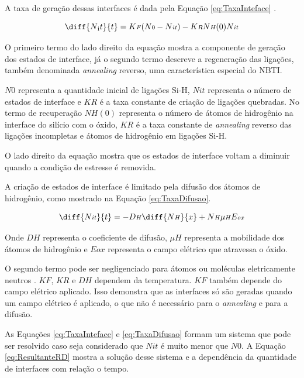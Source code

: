 A taxa de geração dessas interfaces é dada pela Equação \ref{eq:TaxaInteface} \cite{Lorenz}.

\begin{equation}
    \label{eq:TaxaInteface}
    \diff{N{\textsubscript it}}{t} = K{\scriptstyle F}(N{\scriptstyle 0} - N{\scriptstyle it}) - K{\scriptstyle R}N{\scriptstyle H}(0)N{\scriptstyle it}
\end{equation}

O primeiro termo do lado direito da equação mostra a componente de geração dos estados de interface, já o segundo termo descreve a regeneração das ligações, também denominada \textit{annealing} reverso, uma característica especial do NBTI.

$N\scriptstyle{0}$ representa a quantidade inicial de ligações Si-H, $N\scriptstyle{it}$ representa o número de estados de interface e $K\scriptstyle{R}$ é a taxa constante de criação de ligações quebradas. No termo de recuperação $N\scriptstyle{H}(0)$ representa o número de átomos de hidrogênio na interface do silício com o óxido, $K\scriptstyle{R}$ é a taxa constante de \textit{annealing} reverso das ligações incompletas e átomos de hidrogênio em ligações Si-H.

O lado direito da equação mostra que os estados de interface voltam a diminuir quando a condição de estresse é removida.

A criação de estados de interface é limitado pela difusão dos átomos de hidrogênio, como mostrado na Equação \ref{eq:TaxaDifusao}.

\begin{equation}
    \label{eq:TaxaDifusao}
    \diff{N{\scriptstyle it}}{t} = - D{\scriptstyle H}\diff{N{\scriptstyle H}}{x} + N{\scriptstyle H}\mu{\scriptstyle H}E{\scriptstyle ox}
\end{equation}

Onde $D\scriptstyle{H}$ representa o coeficiente de difusão, $\mu\scriptstyle{H}$ representa a mobilidade dos átomos de hidrogênio e $E\scriptstyle{ox}$ representa o campo elétrico que atravessa o óxido.

O segundo termo pode ser negligenciado para átomos ou moléculas eletricamente neutros \cite{Lorenz}. $K\scriptstyle{F}$, $K\scriptstyle{R}$ e $D\scriptstyle{H}$ dependem da temperatura. $K\scriptstyle{F}$ também depende do campo elétrico aplicado. Isso demonstra que as interfaces só são geradas quando um campo elétrico é aplicado, o que não é necessário para o \textit{annealing} e para a difusão.

As Equações \ref{eq:TaxaInteface} e \ref{eq:TaxaDifusao} formam um sistema que pode ser resolvido caso seja considerado que $N\scriptstyle{it}$ é muito menor que $N\scriptstyle{0}$. A Equação \ref{eq:ResultanteRD} mostra a solução desse sistema e a dependência da quantidade de interfaces com relação o tempo.

